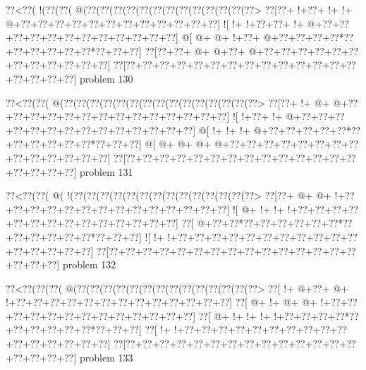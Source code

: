 \vbox{\vbox{\goo
\0??<\0??(\- !(\0??(\0??(\- @(\0??(\0??(\0??(\0??(\0??(\0??(\0??(\0??(\0??(\0??(\0??(\0??(\0??>
\0??[\0??+\- !+\0??+\- !+\- !+\- @+\0??+\0??+\0??+\0??+\0??+\0??+\0??+\0??+\0??+\0??+\0??+\0??]
\- ![\- !+\- !+\0??+\0??+\- !+\- @+\0??+\0??+\0??+\0??+\0??+\0??+\0??+\0??+\0??+\0??+\0??+\0??]
\- @[\- @+\- @+\- !+\0??+\- @+\0??+\0??+\0??+\0??*\0??+\0??+\0??+\0??+\0??+\0??*\0??+\0??+\0??]
\0??[\0??+\0??+\- @+\- @+\0??+\- @+\0??+\0??+\0??+\0??+\0??+\0??+\0??+\0??+\0??+\0??+\0??+\0??]
\0??[\0??+\0??+\0??+\0??+\0??+\0??+\0??+\0??+\0??+\0??+\0??+\0??+\0??+\0??+\0??+\0??+\0??+\0??]
}
\hfil problem 130\hfil\break
}



\vbox{\vbox{\goo
\0??<\0??(\0??(\- @(\0??(\0??(\0??(\0??(\0??(\0??(\0??(\0??(\0??(\0??(\0??(\0??(\0??(\0??(\0??>
\0??[\0??+\- !+\- @+\- @+\0??+\0??+\0??+\0??+\0??+\0??+\0??+\0??+\0??+\0??+\0??+\0??+\0??+\0??]
\- ![\- !+\0??+\- !+\- @+\0??+\0??+\0??+\0??+\0??+\0??+\0??+\0??+\0??+\0??+\0??+\0??+\0??+\0??]
\- @[\- !+\- !+\- !+\- @+\0??+\0??+\0??+\0??+\0??*\0??+\0??+\0??+\0??+\0??+\0??*\0??+\0??+\0??]
\- @[\- @+\- @+\- @+\- @+\0??+\0??+\0??+\0??+\0??+\0??+\0??+\0??+\0??+\0??+\0??+\0??+\0??+\0??]
\0??[\0??+\0??+\0??+\0??+\0??+\0??+\0??+\0??+\0??+\0??+\0??+\0??+\0??+\0??+\0??+\0??+\0??+\0??]
}
\hfil problem 131\hfil\break
}



\vbox{\vbox{\goo
\0??<\0??(\0??(\- @(\- !(\0??(\0??(\0??(\0??(\0??(\0??(\0??(\0??(\0??(\0??(\0??(\0??(\0??(\0??>
\0??[\0??+\- @+\- @+\- !+\0??+\0??+\0??+\0??+\0??+\0??+\0??+\0??+\0??+\0??+\0??+\0??+\0??+\0??]
\- ![\- @+\- !+\- !+\- !+\0??+\0??+\0??+\0??+\0??+\0??+\0??+\0??+\0??+\0??+\0??+\0??+\0??+\0??]
\0??[\- @+\0??+\0??*\0??+\0??+\0??+\0??+\0??+\0??*\0??+\0??+\0??+\0??+\0??+\0??*\0??+\0??+\0??]
\- ![\- !+\- !+\0??+\0??+\0??+\0??+\0??+\0??+\0??+\0??+\0??+\0??+\0??+\0??+\0??+\0??+\0??+\0??]
\0??[\0??+\0??+\0??+\0??+\0??+\0??+\0??+\0??+\0??+\0??+\0??+\0??+\0??+\0??+\0??+\0??+\0??+\0??]
}
\hfil problem 132\hfil\break
}



\vbox{\vbox{\goo
\0??<\0??(\0??(\0??(\- @(\0??(\0??(\0??(\0??(\0??(\0??(\0??(\0??(\0??(\0??(\0??(\0??(\0??(\0??>
\0??[\- !+\- @+\0??+\- @+\- !+\0??+\0??+\0??+\0??+\0??+\0??+\0??+\0??+\0??+\0??+\0??+\0??+\0??]
\0??[\- @+\- !+\- @+\- @+\- !+\0??+\0??+\0??+\0??+\0??+\0??+\0??+\0??+\0??+\0??+\0??+\0??+\0??]
\0??[\- @+\- !+\- !+\- !+\- !+\0??+\0??+\0??+\0??*\0??+\0??+\0??+\0??+\0??+\0??*\0??+\0??+\0??]
\0??[\- !+\- !+\0??+\0??+\0??+\0??+\0??+\0??+\0??+\0??+\0??+\0??+\0??+\0??+\0??+\0??+\0??+\0??]
\0??[\0??+\0??+\0??+\0??+\0??+\0??+\0??+\0??+\0??+\0??+\0??+\0??+\0??+\0??+\0??+\0??+\0??+\0??]
}
\hfil problem 133\hfil\break
}



